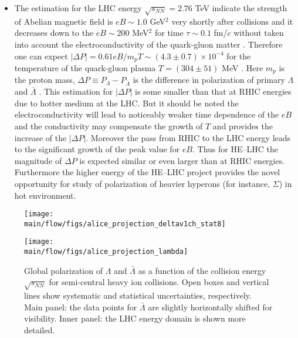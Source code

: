 \begin{itemize}
	\item
The estimation for the LHC energy $\sqrt{s_{NN}}=2.76$ TeV indicate the strength of Abelian magnetic field is $eB \sim 1.0$ GeV$^{2}$ very shortly after collisions and it decreases down to the $eB \sim 200$ MeV$^{2}$ for time $\tau \sim 0.1$ fm/$c$ without taken into account the electroconductivity of the quark-gluon matter \cite{AHEP-2014-193039-2014,JPCS-668-012129-2016,JPCS-675-022021-2016}. Therefore one can expect $|\Delta P|=0.61eB/m_{p}T \sim (4.3 \pm 0.7) \times 10^{-4}$ for the temperature of the quark-gluon plasma $T=(304 \pm 51)$ MeV \cite{NPA-904-905-573c-2013}. Here $m_{p}$ is the proton mass, $\Delta P \equiv P_{\Lambda}-P_{\bar{\Lambda}}$ is the difference in polarization of primary $\Lambda$ and $\bar{\Lambda}$ \cite{PRC-95-054902-2017}. This estimation for $|\Delta P|$ is some smaller than that at RHIC energies due to hotter medium at the LHC. But it should be noted the electroconductivity will lead to noticeably weaker time dependence of the $eB$ \cite{AHEP-2013-490495-2013} and the conductivity may compensate the growth of $T$ and provides the increase of the $|\Delta P|$. Moreover the pass from RHIC to the LHC energy leads to the significant growth of the peak value for $eB$. Thus for HE--LHC the magnitude of $\Delta P$ is expected similar or even larger than at RHIC energies. Furthermore the higher energy of the HE--LHC project provides the novel opportunity for study of polarization of heavier hyperons (for instance, $\Sigma$) in hot environment.
\end{itemize}

\begin{figure}[!htb]
\begin{center}
\texttt{[image: \\main/flow/figs/alice\_projection\_deltav1ch\_stat8]}
\caption{
}
\label{fig:alice_delta_v1}
\end{center}
\end{figure}


\begin{figure*}[!htb]
\begin{center}
\texttt{[image: \\main/flow/figs/alice\_projection\_lambda]}
\caption{Global polarization of $\Lambda$ and $\bar{\Lambda}$ as a function of the collision energy $\sqrt{s_{NN}}$ for semi-central heavy ion collisions. Open boxes
and vertical lines show systematic and statistical uncertainties,
respectively. Main panel: the data points for $\bar{\Lambda}$ are slightly horizontally shifted for visibility. Inner panel: the LHC energy domain is shown more detailed.
}
\label{fig:alice_lambda}
\end{center}
\end{figure*}

